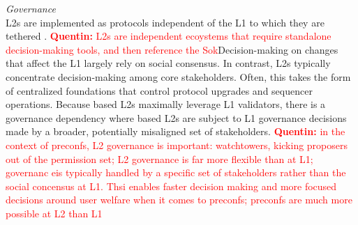 \documentclass[a4paper]{article}
\theoremstyle{boldstyle}
\newcommand{\qb}[1]{\textcolor{red}{\textbf{Quentin:} #1}}
\begin{document}


    \textit{Governance} \\
    L2s are implemented as protocols independent of the L1 to which they are tethered \cite{SoK_L2s}. \qb{L2s are independent ecoystems that require standalone decision-making tools, and then reference the Sok}Decision-making on changes that affect the L1 largely rely on social consensus. In contrast, L2s typically concentrate decision-making among core stakeholders. Often, this takes the form of centralized foundations that control protocol upgrades and sequencer operations. 
    Because based L2s maximally leverage L1 validators, there is a governance dependency where based L2s are subject to L1 governance decisions made by a broader, potentially misaligned set of stakeholders. 
    \qb{in the context of preconfs, L2 governance is important: watchtowers, kicking proposers out of the permission set; L2 governance is far more flexible than at L1; governanc eis typically handled by a specific set of stakeholders rather than the social concensus at L1. Thsi enables faster decision making and more focused decisions around user welfare when it comes to preconfs; preconfs are much more possible at L2 than L1}

    
\end{document}
